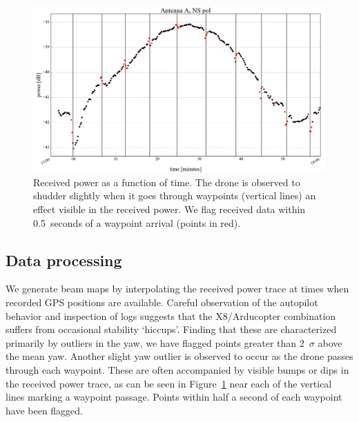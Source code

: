 \documentclass[preprint2,numberedappendix,tighten,twocolappendix]{aastex6}
\begin{document}
\begin{figure}[htb]
\includegraphics[width=\columnwidth]{figures/GB_waypoint_flagging_zoom.png}
\caption{Received power as a function of time. The drone is observed to shudder slightly when it goes through waypoints (vertical lines) an effect visible in the received power. We flag received data within 0.5~seconds of a waypoint arrival (points in red).}
\label{fig:waypoint_flagging}
\end{figure}


\subsection{Data processing}
\label{sec:processing}

We generate beam maps by interpolating the received power trace at times when recorded GPS positions are available.  Careful observation of the autopilot behavior and inspection of logs suggests that the X8/Arducopter combination suffers from occasional stability `hiccups'. Finding that these are characterized primarily by outliers in the yaw, we have flagged points greater than 2~$\sigma$ above the mean yaw.  Another slight yaw outlier is observed to occur as the drone passes through each waypoint.  These are often accompanied by visible bumps or dips in the received power trace, as can be seen in Figure~\ref{fig:waypoint_flagging} near each of the vertical lines marking a waypoint passage.  Points within half a second of each waypoint have been flagged.
\end{document}
